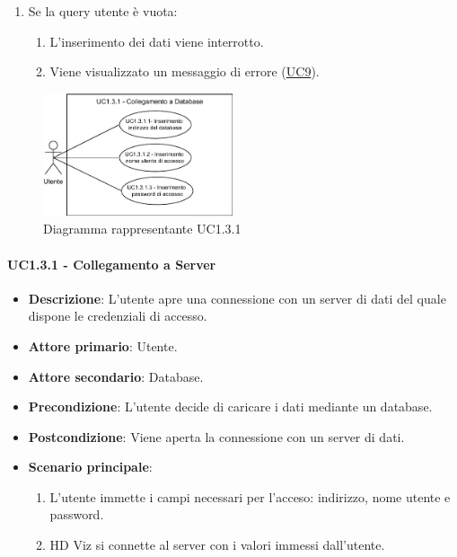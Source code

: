 \begin{itemize}
\begin{enumerate}
        \item Se la query utente è vuota:
        \begin{enumerate}
            \item L'inserimento dei dati viene interrotto.
            \item Viene visualizzato un messaggio di errore (\hyperref[sub:uc9]{UC9}).
        \end{enumerate}
    \end{enumerate}
\end{itemize}


\newpage
\begin{figure}[h]
    \centering
    \includegraphics[width=0.5\textwidth]{componenti/casi-duso/diagrammi/UC1_3_1.pdf}
    \caption{Diagramma rappresentante UC1.3.1}
    \label{fig:UC1.3}
\end{figure}


\paragraph{UC1.3.1 - Collegamento a Server}
\label{par:uc1.3.1}
\begin{itemize}
    \item \textbf{Descrizione}: L'utente apre una connessione con un server di dati del quale 
                                dispone le credenziali di accesso. 

    \item \textbf{Attore primario}: Utente.
    \item \textbf{Attore secondario}: Database.
    
    \item \textbf{Precondizione}:   L'utente decide di caricare i dati mediante un database.
    \item \textbf{Postcondizione}:  Viene aperta la connessione con un server di dati.

	\item \textbf{Scenario principale}:
		\begin{enumerate}
			\item L'utente immette i campi necessari per l'acceso: indirizzo, nome utente e password.
			\item HD Viz si connette al server con i valori immessi dall'utente.
        \end{enumerate}
    \end{itemize}


